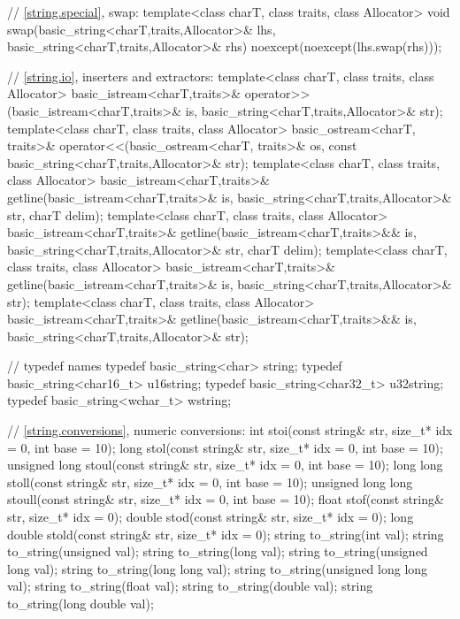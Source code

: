 \begin{codeblock}
{  // \ref{string.special}, swap:
  template<class charT, class traits, class Allocator>
    void swap(basic_string<charT,traits,Allocator>& lhs,
              basic_string<charT,traits,Allocator>& rhs)
      noexcept(noexcept(lhs.swap(rhs)));

  // \ref{string.io}, inserters and extractors:
  template<class charT, class traits, class Allocator>
    basic_istream<charT,traits>&
      operator>>(basic_istream<charT,traits>& is,
                 basic_string<charT,traits,Allocator>& str);
  template<class charT, class traits, class Allocator>
    basic_ostream<charT, traits>&
      operator<<(basic_ostream<charT, traits>& os,
                 const basic_string<charT,traits,Allocator>& str);
  template<class charT, class traits, class Allocator>
    basic_istream<charT,traits>&
      getline(basic_istream<charT,traits>& is,
              basic_string<charT,traits,Allocator>& str,
              charT delim);
  template<class charT, class traits, class Allocator>
    basic_istream<charT,traits>&
      getline(basic_istream<charT,traits>&& is,
              basic_string<charT,traits,Allocator>& str,
              charT delim);
  template<class charT, class traits, class Allocator>
    basic_istream<charT,traits>&
      getline(basic_istream<charT,traits>& is,
              basic_string<charT,traits,Allocator>& str);
  template<class charT, class traits, class Allocator>
    basic_istream<charT,traits>&
      getline(basic_istream<charT,traits>&& is,
              basic_string<charT,traits,Allocator>& str);

  //  typedef names
  typedef basic_string<char> string;
  typedef basic_string<char16_t> u16string;
  typedef basic_string<char32_t> u32string;
  typedef basic_string<wchar_t> wstring;

  // \ref{string.conversions}, numeric conversions:
  int stoi(const string& str, size_t* idx = 0, int base = 10);
  long stol(const string& str, size_t* idx = 0, int base = 10);
  unsigned long stoul(const string& str, size_t* idx = 0, int base = 10);
  long long stoll(const string& str, size_t* idx = 0, int base = 10);
  unsigned long long stoull(const string& str, size_t* idx = 0, int base = 10);
  float stof(const string& str, size_t* idx = 0);
  double stod(const string& str, size_t* idx = 0);
  long double stold(const string& str, size_t* idx = 0);
  string to_string(int val);
  string to_string(unsigned val);
  string to_string(long val);
  string to_string(unsigned long val);
  string to_string(long long val);
  string to_string(unsigned long long val);
  string to_string(float val);
  string to_string(double val);
  string to_string(long double val);

}
\end{codeblock}

